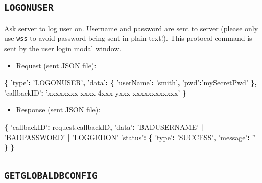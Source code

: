 \documentclass[]{book}
\newenvironment{Shaded}{\begin{snugshade}}{\end{snugshade}}
\newcommand{\AttributeTok}[1]{\textcolor[rgb]{0.77,0.63,0.00}{#1}}
\newcommand{\NormalTok}[1]{#1}
\newcommand{\OperatorTok}[1]{\textcolor[rgb]{0.81,0.36,0.00}{\textbf{#1}}}
\newcommand{\StringTok}[1]{\textcolor[rgb]{0.31,0.60,0.02}{#1}}
\newcommand{\VariableTok}[1]{\textcolor[rgb]{0.00,0.00,0.00}{#1}}
\providecommand{\tightlist}{%
  \setlength{\itemsep}{0pt}\setlength{\parskip}{0pt}}
\begin{document}
\hypertarget{logonuser}{%
\subsection{\texorpdfstring{\texttt{LOGONUSER}}{LOGONUSER}}\label{logonuser}}

Ask server to log user on. Username and password are sent to server (please only use \texttt{wss} to avoid password being sent in plain text!). This protocol command is sent by the user login modal window.

\begin{itemize}
\tightlist
\item
  Request (sent JSON file):
\end{itemize}

\begin{Shaded}
\begin{Highlighting}[]
\OperatorTok{\{}
  \StringTok{'type'}\OperatorTok{:} \StringTok{'LOGONUSER'}\OperatorTok{,}
  \StringTok{'data'}\OperatorTok{:} \OperatorTok{\{}
    \StringTok{'userName'}\OperatorTok{:} \StringTok{'smith'}\OperatorTok{,}
    \StringTok{'pwd'}\OperatorTok{:}\StringTok{'mySecretPwd'}
  \OperatorTok{\},}
  \StringTok{'callbackID'}\OperatorTok{:} \StringTok{'xxxxxxxx-xxxx-4xxx-yxxx-xxxxxxxxxxxx'}
\OperatorTok{\}}
\end{Highlighting}
\end{Shaded}

\begin{itemize}
\tightlist
\item
  Response (sent JSON file):
\end{itemize}

\begin{Shaded}
\begin{Highlighting}[]
\OperatorTok{\{}
  \StringTok{'callbackID'}\OperatorTok{:} \VariableTok{request}\NormalTok{.}\AttributeTok{callbackID}\OperatorTok{,}
  \StringTok{'data'}\OperatorTok{:} \StringTok{'BADUSERNAME'} \OperatorTok{|} \StringTok{'BADPASSWORD'} \OperatorTok{|} \StringTok{'LOGGEDON'}
  \StringTok{'status'}\OperatorTok{:} \OperatorTok{\{}
    \StringTok{'type'}\OperatorTok{:} \StringTok{'SUCCESS'}\OperatorTok{,}
    \StringTok{'message'}\OperatorTok{:} \StringTok{''}
  \OperatorTok{\}}
\OperatorTok{\}}
\end{Highlighting}
\end{Shaded}

\hypertarget{getglobaldbconfig}{%
\subsection{\texorpdfstring{\texttt{GETGLOBALDBCONFIG}}{GETGLOBALDBCONFIG}}\label{getglobaldbconfig}}
\end{document}
